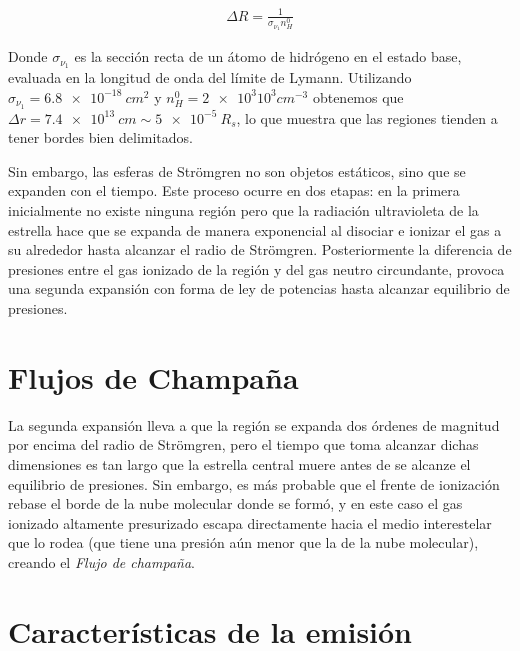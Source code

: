 \begin{align}
\Delta R = \frac{1}{\sigma_{\nu_1}n^0_H}  
\end{align}

Donde $\sigma_{\nu_1}$ es la sección recta de un átomo de hidrógeno en el estado base, evaluada en la longitud de onda del límite de Lymann. Utilizando $\sigma_{\nu_1} = \SI{6.8e-18}{cm^2}$ y $n^0_H = \SI{2e3} 10^{3}{cm^{-3}}$ obtenemos que $\Delta r = \SI{7.4e13}{cm} \sim \SI{5e-5}{R_s}$, lo que muestra que las regiones  tienden a tener bordes bien delimitados.

Sin embargo, las esferas de Strömgren no son objetos estáticos, sino que se expanden con el tiempo. Este proceso ocurre en dos etapas: en la primera inicialmente no existe ninguna región  pero que la radiación ultravioleta de la estrella hace que se expanda de manera exponencial al disociar e ionizar el gas a su alrededor hasta alcanzar el radio de Strömgren. Posteriormente la diferencia de presiones entre el gas ionizado de la región  y del gas neutro circundante, provoca una segunda expansión con forma de ley de potencias hasta alcanzar equilibrio de presiones.

\section{Flujos de Champaña}
La segunda expansión lleva a que la región  se expanda dos órdenes de magnitud por encima del radio de Strömgren, pero el tiempo que toma alcanzar dichas dimensiones es tan largo que la estrella central muere antes de se alcanze el equilibrio de presiones. Sin embargo, es más probable que el frente de ionización rebase el borde de la nube molecular donde se formó, y en este caso el gas ionizado altamente presurizado escapa directamente hacia el medio interestelar que lo rodea (que tiene una presión aún menor que la de la nube molecular), creando el \textit{Flujo de champaña}.

\section{Características de la emisión}

